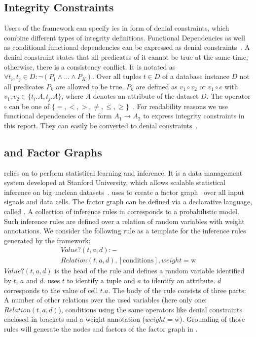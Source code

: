   \subsection{Integrity Constraints}
  Users of the \holoclean{} framework can specify \glspl{ic} in form of denial constraints, which combine different types of integrity definitions.
  Functional Dependencies as well as conditional functional dependencies can be expressed as denial constraints~\cite{fd_to_dc}.
  A denial constraint states that all predicates of it cannot be true at the same time, otherwise, there is a consistency conflict.
  It is notated as $\forall t_i, t_j \in D: \neg(P_1 \wedge \dots \wedge P_K)$.
  Over all tuples $t \in D$ of a database instance $D$ not all predicates $P_k$ are allowed to be true.
  $P_k$ are defined as $v_1 \circ v_2$ or $v_1 \circ c$ with $v_1, v_2 \in \{t_i.A, t_j.A\}$, where $A$ denotes an attribute of the dataset $D$.
  The operator $\circ$ can be one of $\{=,<,>,\neq,\leq,\geq\}$~\cite{chu2013discoveringdc}.
  For readability reasons we use functional dependencies of the form $A_1 \to A_2$ to express integrity constraints in this report.
  They can easily be converted to denial constraints~\cite{fd_to_dc}.
  
  \subsection{\deepdive{} and Factor Graphs}
  \holoclean{} relies on \deepdive{} to perform statistical learning and inference.
  It is a data management system developed at Stanford University, which allows scalable statistical inference on big unclean datasets~\cite{deepdive}.
  \holoclean{} uses \deepdive{} to create a factor graph~\cite{pgmFactorGraph} over all input signals and data cells.
  The factor graph can be defined via a declarative language, called \ddlog{}.
  A collection of inference rules in \deepdive{} corresponds to a probabilistic model.
  Such inference rules are defined over a relation of random variables with weight annotations.
  We consider the following \ddlog{} rule as a template for the inference rules generated by the \holoclean{} framework:
  \begin{multline}
    Value?(t,a,d):-\\Relation(t,a,d), [\text{conditions}], weight=\text{w}
  \end{multline}
  $Value?(t,a,d)$ is the head of the rule and defines a random variable identified by $t$, $a$ and $d$.
  \holoclean{} uses $t$ to identify a tuple and $a$ to identify an attribute.
  $d$ corresponds to the value of cell $t.a$.
  The body of the rule consists of three parts:
  A number of other relations over the used variables (here only one: $Relation(t,a,d)$),
  conditions using the same operators like denial constraints enclosed in brackets and
  a weight annotation ($weight=\text{w}$).
  Grounding of those rules will generate the nodes and factors of the factor graph in \deepdive{}.
  


